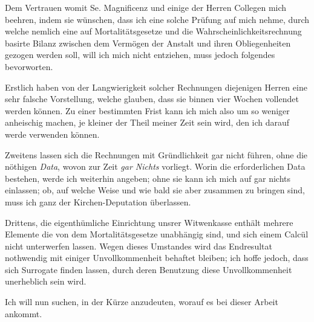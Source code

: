 Dem Vertrauen womit Se. Magnificenz und einige der Herren Collegen mich beehren, indem sie wünschen, dass ich eine solche Prüfung auf mich nehme, durch welche nemlich eine auf Mortalitätsgesetze und die Wahrscheinlichkeitsrechnung basirte Bilanz zwischen dem Vermögen der Anstalt und ihren Obliegenheiten gezogen werden soll, will ich mich nicht entziehen, muss jedoch folgendes bevorworten.

Erstlich haben von der Langwierigkeit solcher Rechnungen diejenigen Herren eine sehr falsche Vorstellung, welche glauben, dass sie binnen vier Wochen vollendet werden können. Zu einer bestimmten Frist kann ich mich also um so weniger anheischig machen, je kleiner der Theil meiner Zeit sein wird, den ich darauf werde verwenden können.

Zweitens lassen sich die Rechnungen mit Gründlichkeit gar nicht führen, ohne die nöthigen \textit{Data}, wovon zur Zeit \textit{gar Nichts} vorliegt. Worin die erforderlichen Data bestehen, werde ich weiterhin angeben; ohne sie kann ich mich auf gar nichts einlassen; ob, auf welche Weise und wie bald sie aber zusammen zu bringen sind, muss ich ganz der Kirchen-Deputation überlassen.

Drittens, die eigenthümliche Einrichtung unsrer Witwenkasse enthält mehrere Elemente die von dem Mortalitätsgesetze unabhängig sind, und sich einem Calcül nicht unterwerfen lassen. Wegen dieses Umstandes wird das Endresultat nothwendig mit einiger Unvollkommenheit behaftet bleiben; ich hoffe jedoch, dass sich Surrogate finden lassen, durch deren Benutzung diese Unvollkommenheit unerheblich sein wird.

Ich will nun suchen, in der Kürze anzudeuten, worauf es bei dieser Arbeit ankommt.
